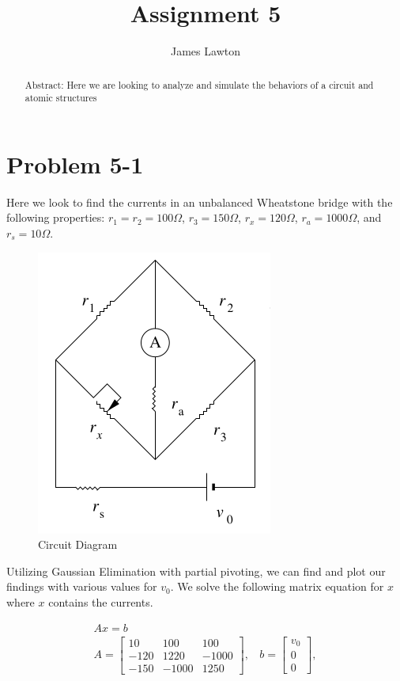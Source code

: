 \documentclass[prb,twocolumn]{revtex4-2}
\begin{document}
\title{Assignment 5}

\author{James Lawton}


\begin{abstract}
Abstract: Here we are looking to analyze and simulate the behaviors of a circuit and atomic structures
\end{abstract}

\maketitle

\section{Problem 5-1}

\noindent
Here we look to find the currents in an unbalanced Wheatstone bridge with the following properties:
$r_1 = r_2 = 100 \Omega$, $r_3 = 150 \Omega$, $r_x = 120 \Omega$, $r_a = 1000 \Omega$, and $r_s = 10 \Omega$.

\begin{figure}[h!]
\centerline{\includegraphics [width=3 in] {circuit}} \caption{Circuit Diagram} \label{secant}
\end{figure}

Utilizing Gaussian Elimination with partial pivoting, we can find and plot our findings with various values for $v_0$. We solve the following matrix equation for $x$ where $x$ contains the currents.

\begin{eqnarray}
  Ax = b \\
  A =
  \begin{bmatrix}
    10 & 100 & 100 \\
    -120 & 1220 & -1000 \\
    -150 & -1000 & 1250
  \end{bmatrix},\ \ \ \ 
  b = 
  \begin{bmatrix}
    v_0 \\
    0 \\
    0
  \end{bmatrix}, 
  \label{namefornewequation}
\end{eqnarray}
\end{document}
